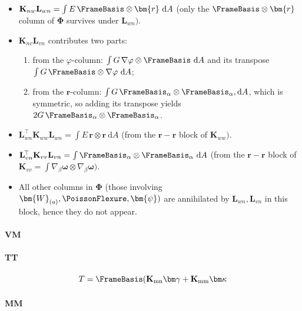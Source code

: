 \begin{itemize}
\item \(\mathbf{K}_{nw}\mathbf{L}_{wn}=\int E\,\FrameBasis\otimes\bm{r}\mathrm{~d}A\) (only the \(\FrameBasis\otimes\bm{r}\) column of \(\bm{\Phi}\) survives under \(\mathbf{L}_{wn})\).
\item \(\mathbf{K}_{nv}\mathbf{L}_{vn}\) contributes two parts:
\begin{enumerate}
  \item[(i)] from the \(\varphi\)-column: \(\int G\,\nabla\varphi\otimes\FrameBasis\mathrm{~d}A\) and its transpose \(\int G\,\FrameBasis\otimes\nabla\varphi\mathrm{~d}A\);
  \item[(ii)] from the \(\bm{r}\)-column: \(\int G\,\FrameBasis_{\alpha}\otimes\FrameBasis_{\alpha},\mathrm{d}A\), which is symmetric, so adding its transpose yields \(2G\,\FrameBasis_{\alpha}\otimes\FrameBasis_{\alpha}\).
  \end{enumerate}
\item \(\mathbf{L}_{wn}^{\!\top}\mathbf{K}_{ww}\mathbf{L}_{wn}=\int E\,\bm{r}\otimes\bm{r}\mathrm{~d}A\) (from the \(\bm{r}\!-\!\bm{r}\) block of \(\mathbf{K}_{ww})\).
\item \(\mathbf{L}_{vn}^{\!\top}\mathbf{K}_{vv}\mathbf{L}_{vn}=\int \FrameBasis_{\alpha}\otimes\FrameBasis_{\alpha}\mathrm{~d}A\) (from the \(\bm{r}\!-\!\bm{r}\) block of \(\mathbf{K}_{vv}=\int\nabla_{\!\beta}\bm\omega\otimes\nabla_{\!\beta}\bm\omega)\).
\item All other columns in \(\bm{\Phi}\) (those involving \(\bm{W}_{(a)},\PoissonFlexure,\bm{\psi})\) are annihilated by \(\mathbf{L}_{wn},\mathbf{L}_{vn}\) in this block, hence they do not appear.
\end{itemize}

\paragraph{VM}

\paragraph{TT}
\[
T = \FrameBasis(\mathbf{K}_{\rm mn}\bm\gamma + \mathbf{K}_{\rm mm}\bm\kappa
\]

\paragraph{MM}
